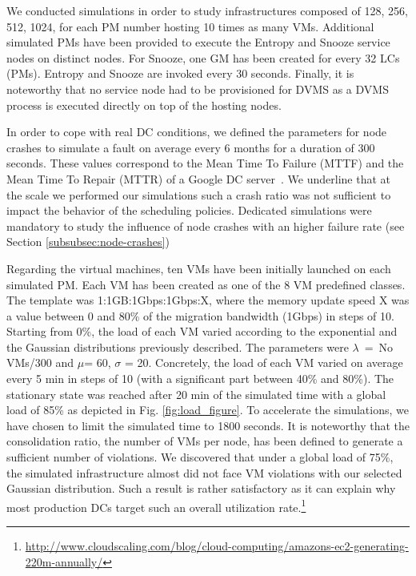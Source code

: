 We conducted simulations in order to study infrastructures composed of
128, 256, 512, 1024,
for each PM number hosting 10 times as many VMs. Additional simulated PMs have
been provided to execute the Entropy and Snooze service nodes on
distinct nodes. For Snooze, one GM has been created for every 32 LCs
(\ie PMs). Entropy and Snooze are invoked every 30 seconds. Finally,
it is noteworthy that no service node had to be provisioned for DVMS
as a DVMS process is executed directly on top of the hosting nodes.

In order to cope with real DC conditions, we defined the parameters
for node crashes to simulate a fault on average every 6 months for a
duration of 300 seconds. These values correspond to the Mean Time To
Failure (MTTF) and the Mean Time To Repair (MTTR) of a Google DC
server~\cite[pp. 107-108]{datacenterAsComputer}. We underline that at
the scale we performed our simulations such a crash ratio was not
sufficient to impact the behavior of the scheduling policies.
Dedicated simulations were mandatory to study the influence of node
crashes with an higher failure rate (see Section \ref{subsubsec:node-crashes})

Regarding the virtual machines, ten VMs have
been initially launched on each simulated PM.  Each VM has been
created as one of the 8 VM predefined classes. The template was
1:1GB:1Gbps:1Gbps:X, where the memory update speed X was a value
between 0 and 80\% of the migration bandwidth (1Gbps) in steps of
10. Starting from 0\%, the load of each VM varied according to the
exponential and the Gaussian distributions previously described. The
parameters were $\lambda$~=~No VMs/300 and $\mu$= 60, $\sigma$ = 20.
Concretely, the load of each VM varied on average every 5 min in steps
of 10 (with a significant part between 40\% and 80\%). The stationary
state was reached after 20 min of the simulated time with a global
load of 85\% as depicted in Fig. \ref{fig:load_figure}. To accelerate
the simulations, we have chosen to limit the simulated time to 1800
seconds. It is noteworthy that the consolidation ratio, \ie the number
of VMs per node, has been defined to generate a sufficient number of
violations. We discovered that under a global load of 75\%, the
simulated infrastructure almost did not face VM violations with our selected
Gaussian distribution. Such a result is rather satisfactory as it can
explain why most production DCs target such an overall utilization
rate.\footnote{\url{http://www.cloudscaling.com/blog/cloud-computing/amazons-ec2-generating-220m-annually/}}

